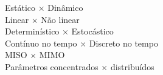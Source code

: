\documentclass[preview]{standalone}
\begin{document}
Estático × Dinâmico\\Linear × Não linear\\Determinístico × Estocástico\\Contínuo no tempo × Discreto no tempo\\MISO × MIMO\\Parâmetros concentrados × distribuídos\\
\end{document}
